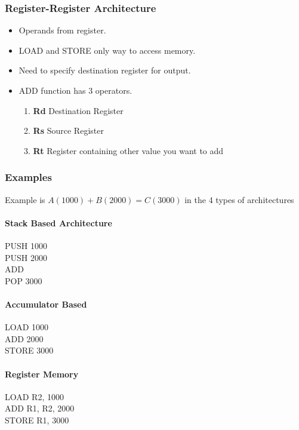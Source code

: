 \documentclass{article}
\newcommand\tab[1][0.5cm]{\hspace*{#1}}
\begin{document}
		\subsubsection{Register-Register Architecture}
			\begin{itemize}
				\item Operands from register.
				\item LOAD and STORE only way to access memory.
				\item Need to specify destination register for output.
				\item ADD function has 3 operators.
					\begin{enumerate}
						\item \textbf{Rd} Destination Register
						\item \textbf{Rs} Source Register 
						\item \textbf{Rt} Register containing other value you want to add
					\end{enumerate}
			\end{itemize}

		\subsubsection{Examples}
			Example is $A(1000) + B(2000) = C(3000)$ in the 4 types of architectures
			
			\paragraph{\tab Stack Based Architecture\\}
					PUSH 1000 \\ \tab
					PUSH 2000 \\ \tab
					ADD \\ \tab
					POP 3000

			\paragraph{\tab Accumulator Based\\}
					LOAD 1000 \\ \tab
					ADD 2000 \\ \tab
					STORE 3000

			\paragraph{\tab Register Memory\\}
					LOAD R2, 1000 \\ \tab
					ADD R1, R2, 2000 \\ \tab
					STORE R1, 3000
\end{document}

